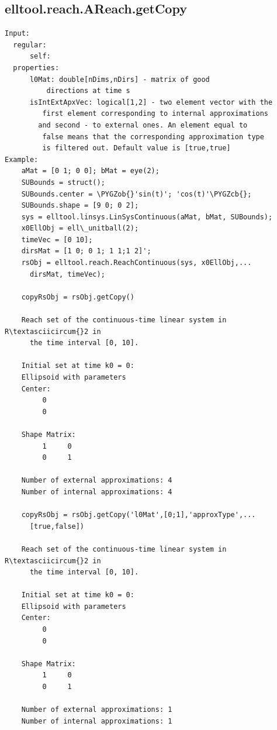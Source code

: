 \documentclass[letterpaper,10pt,english]{sphinxmanual}
\def\PYGZob{\char`\{}
\def\PYGZcb{\char`\}}
\begin{document}
\subsection{elltool.reach.AReach.getCopy}
\label{chap_functions:elltool-reach-areach-getcopy}
\begin{Verbatim}[commandchars=\\\{\}]
Input:
  regular:
      self:
  properties:
      l0Mat: double[nDims,nDirs] - matrix of good
          directions at time s
      isIntExtApxVec: logical[1,2] - two element vector with the
         first element corresponding to internal approximations
        and second - to external ones. An element equal to
         false means that the corresponding approximation type
         is filtered out. Default value is [true,true]
Example:
    aMat = [0 1; 0 0]; bMat = eye(2);
    SUBounds = struct();
    SUBounds.center = \PYGZob{}'sin(t)'; 'cos(t)'\PYGZcb{};
    SUBounds.shape = [9 0; 0 2];
    sys = elltool.linsys.LinSysContinuous(aMat, bMat, SUBounds);
    x0EllObj = ell\_unitball(2);
    timeVec = [0 10];
    dirsMat = [1 0; 0 1; 1 1;1 2]';
    rsObj = elltool.reach.ReachContinuous(sys, x0EllObj,...
      dirsMat, timeVec);

    copyRsObj = rsObj.getCopy()

    Reach set of the continuous-time linear system in R\textasciicircum{}2 in
      the time interval [0, 10].

    Initial set at time k0 = 0:
    Ellipsoid with parameters
    Center:
         0
         0

    Shape Matrix:
         1     0
         0     1

    Number of external approximations: 4
    Number of internal approximations: 4

    copyRsObj = rsObj.getCopy('l0Mat',[0;1],'approxType',...
      [true,false])

    Reach set of the continuous-time linear system in R\textasciicircum{}2 in
      the time interval [0, 10].

    Initial set at time k0 = 0:
    Ellipsoid with parameters
    Center:
         0
         0

    Shape Matrix:
         1     0
         0     1

    Number of external approximations: 1
    Number of internal approximations: 1
\end{Verbatim}
\end{document}

